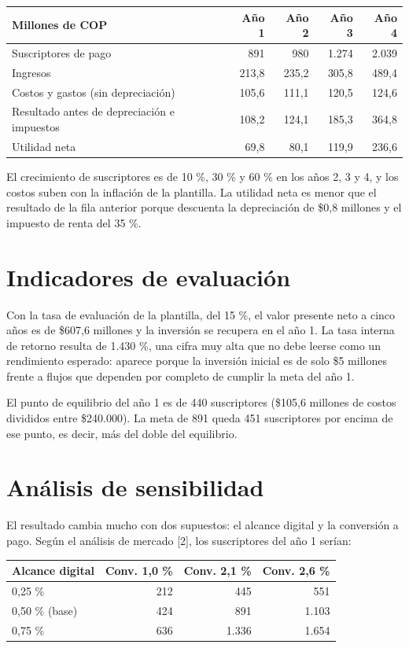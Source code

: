 \documentclass[11pt,a4paper]{article}
\begin{document}
\begin{tabularx}{\textwidth}{X r r r r}
  \toprule
  \textbf{Millones de COP} & \textbf{Año 1} & \textbf{Año 2} & \textbf{Año 3} & \textbf{Año 4} \\
  \midrule
  Suscriptores de pago & 891 & 980 & 1.274 & 2.039 \\
  Ingresos & 213,8 & 235,2 & 305,8 & 489,4 \\
  Costos y gastos (sin depreciación) & 105,6 & 111,1 & 120,5 & 124,6 \\
  Resultado antes de depreciación e impuestos & 108,2 & 124,1 & 185,3 & 364,8 \\
  Utilidad neta & 69,8 & 80,1 & 119,9 & 236,6 \\
  \bottomrule
\end{tabularx}

El crecimiento de suscriptores es de 10 \%, 30 \% y 60 \% en los años 2, 3 y 4, y los costos suben con la inflación de la plantilla. La utilidad neta es menor que el resultado de la fila anterior porque descuenta la depreciación de \$0,8 millones y el impuesto de renta del 35 \%.

\section{Indicadores de evaluación}

Con la tasa de evaluación de la plantilla, del 15 \%, el valor presente neto a cinco años es de \$607,6 millones y la inversión se recupera en el año 1. La tasa interna de retorno resulta de 1.430 \%, una cifra muy alta que no debe leerse como un rendimiento esperado: aparece porque la inversión inicial es de solo \$5 millones frente a flujos que dependen por completo de cumplir la meta del año 1.

El punto de equilibrio del año 1 es de 440 suscriptores (\$105,6 millones de costos divididos entre \$240.000). La meta de 891 queda 451 suscriptores por encima de ese punto, es decir, más del doble del equilibrio.

\section{Análisis de sensibilidad}

El resultado cambia mucho con dos supuestos: el alcance digital y la conversión a pago. Según el análisis de mercado [2], los suscriptores del año 1 serían:

\begin{tabularx}{\textwidth}{X r r r}
  \toprule
  \textbf{Alcance digital} & \textbf{Conv. 1,0 \%} & \textbf{Conv. 2,1 \%} & \textbf{Conv. 2,6 \%} \\
  \midrule
  0,25 \% & 212 & 445 & 551 \\
  0,50 \% (base) & 424 & 891 & 1.103 \\
  0,75 \% & 636 & 1.336 & 1.654 \\
  \bottomrule
\end{tabularx}
\end{document}
